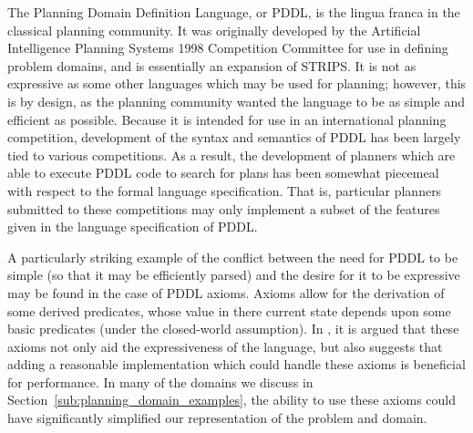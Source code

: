 The Planning Domain Definition Language, or PDDL, is the lingua franca in the classical planning community. It was originally developed by the Artificial Intelligence Planning Systems 1998 Competition Committee for use in defining problem domains, and is essentially an expansion of STRIPS. It is not as expressive as some other languages which may be used for planning; however, this is by design, as the planning community wanted the language to be as simple and efficient as possible. Because it is intended for use in an international planning competition, development of the syntax and semantics of PDDL has been largely tied to various competitions. As a result, the development of planners which are able to execute PDDL code to search for plans has been somewhat piecemeal with respect to the formal language specification. That is, particular planners submitted to these competitions may only implement a subset of the features given in the language specification of PDDL. 

A particularly striking example of the conflict between the need for PDDL to be simple (so that it may be efficiently parsed) and the desire for it to be expressive may be found in the case of PDDL axioms. Axioms allow for the derivation of some derived predicates, whose value in there current state depends upon some basic predicates (under the closed-world assumption). In \cite{Thiebaux:2003ys}, it is argued that these axioms not only aid the expressiveness of the language, but also suggests that adding a reasonable implementation which could handle these axioms is beneficial for performance. In many of the domains we discuss in Section~\ref{sub:planning_domain_examples}, the ability to use these axioms could have significantly simplified our representation of the problem and domain.